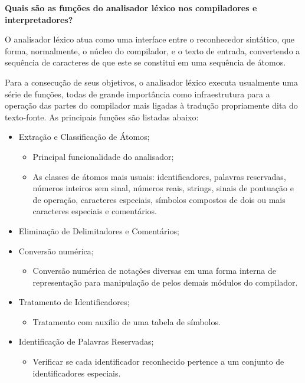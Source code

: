 
\textbf{Quais são as funções do analisador léxico nos compiladores e interpretadores?}

O  analisador léxico atua como uma interface entre o reconhecedor sintático, que forma, normalmente, o núcleo do compilador, e o texto de entrada, convertendo a sequência de caracteres de que este se constitui em uma sequência de átomos.

Para a consecução de seus objetivos, o analisador léxico executa usualmente uma série de funções, todas de grande importância como infraestrutura para a operação das partes do compilador mais ligadas à tradução propriamente dita do texto-fonte. As principais funções são listadas abaixo:

\begin{itemize}

	\item Extração e Classificação de Átomos;
	\begin{itemize}
		\item Principal funcionalidade do analisador;
		\item As classes de átomos mais usuais: identificadores, palavras reservadas, números inteiros sem sinal, números reais, strings, sinais de pontuação e de operação, caracteres especiais, símbolos compostos de dois ou mais caracteres especiais e comentários.
	\end{itemize}
	
	\item Eliminação de Delimitadores e Comentários;
	
	\item Conversão numérica;
	\begin{itemize}
		\item Conversão numérica de notações diversas em uma forma interna de representação para manipulação de pelos demais módulos do compilador.
	\end{itemize}
	
	\item Tratamento de Identificadores;
	\begin{itemize}
		\item Tratamento com auxílio de uma tabela de símbolos.
	\end{itemize}
	
	\item Identificação de Palavras Reservadas;
	\begin{itemize}
		\item Verificar se cada identificador reconhecido pertence a um conjunto de identificadores especiais.
	\end{itemize}
	

\end{itemize}
